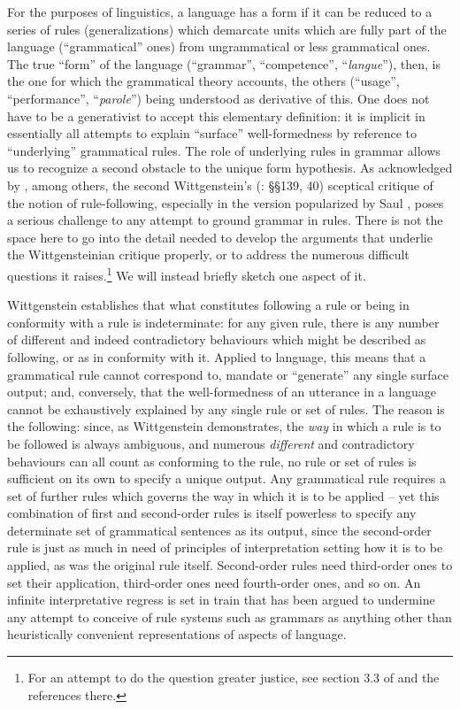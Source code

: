 \documentclass[output=paper]{langscibook}
\begin{document}
For the purposes of linguistics, a language has a form if it can be reduced to a series of rules (generalizations) which demarcate units which are fully part of the language (``grammatical'' ones) from ungrammatical or less grammatical ones. The true ``form'' of the language (``grammar'', ``competence'', ``\emph{langue}''), then, is the one for which the grammatical theory accounts, the others (``usage'', ``performance'', ``\emph{parole}'') being understood as derivative of this. One does not have to be a generativist to accept this elementary definition: it is implicit in essentially all attempts to explain ``surface'' well-formedness by reference to ``underlying'' grammatical rules. The role of underlying rules in grammar allows us to recognize a second obstacle to the unique form hypothesis. As acknowledged by \citet{Chomsky1986}, among others, the second Wittgenstein's (\citeyear{Wittgenstein20011953}: §§139, 40) sceptical critique of the notion of rule-following, especially in the version popularized by Saul \citet{Kripke1982}, poses a serious challenge to any attempt to ground grammar in rules. There is not the space here to go into the detail needed to develop the arguments that underlie the Wittgensteinian critique properly, or to address the numerous difficult questions it raises.\footnote{For an attempt to do the question greater justice, see section 3.3 of \citet{Riemer2005} and the references there.} We will instead briefly sketch one aspect of it.

Wittgenstein establishes that what constitutes following a rule or being in conformity with a rule is indeterminate: for any given rule, there is any number of different and indeed contradictory behaviours which might be described as following, or as in conformity with it. Applied to language, this means that a grammatical rule cannot correspond to, mandate or ``generate'' any single surface output; and, conversely, that the well-formedness of an utterance in a language cannot be exhaustively explained by any single rule or set of rules. The reason is the following: since, as Wittgenstein demonstrates, the \emph{way} in which a rule is to be followed is always ambiguous, and numerous \emph{different} and contradictory behaviours can all count as conforming to the rule, no rule or set of rules is sufficient on its own to specify a unique output. Any grammatical rule requires a set of further rules which governs the way in which it is to be applied -- yet this combination of first and second-order rules is itself powerless to specify any determinate set of grammatical sentences as its output, since the second-order rule is just as much in need of principles of interpretation setting how it is to be applied, as was the original rule itself. Second-order rules need third-order ones to set their application, third-order ones need fourth-order ones, and so on. An infinite interpretative regress is set in train that has been argued to undermine any attempt to conceive of rule systems such as grammars as anything other than heuristically convenient representations of aspects of language.
\end{document}
